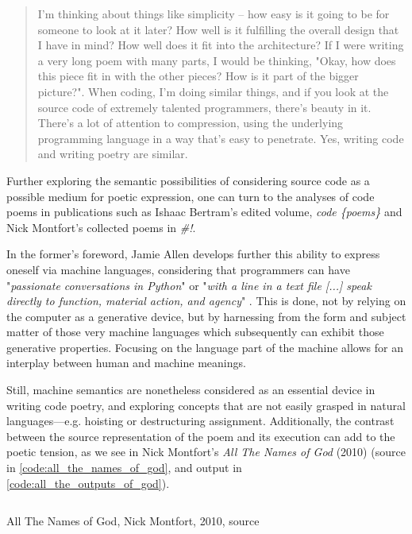 \begin{quote}
  I'm thinking about things like simplicity -- how easy is it going to be for someone to look at it later? How well is it fulfilling the overall design that I have in mind? How well does it fit into the architecture? If I were writing a very long poem with many parts, I would be thinking, "Okay, how does this piece fit in with the other pieces? How is it part of the bigger picture?". When coding, I'm doing similar things, and if you look at the source code of extremely talented programmers, there's beauty in it. There's a lot of attention to compression, using the underlying programming language in a way that's easy to penetrate. Yes, writing code and writing poetry are similar.  \citep{jeiss_poetry_2002}
\end{quote}

Further exploring the semantic possibilities of considering source code as a possible medium for poetic expression, one can turn to the analyses of code poems in publications such as Ishaac Bertram's edited volume, \emph{code \{poems\}} and Nick Montfort's collected poems in \emph{\#!}.

In the former's foreword, Jamie Allen develops further this ability to express oneself via machine languages, considering that programmers can have "\emph{passionate conversations in Python}" or "\emph{with a line in a text file [...] speak directly to function, material action, and agency}" \citep{bertram_code_2012}. This is done, not by relying on the computer as a generative device, but by harnessing from the form and subject matter of those very machine languages which subsequently can exhibit those generative properties. Focusing on the language part of the machine allows for an interplay between human and machine meanings.

Still, machine semantics are nonetheless considered as an essential device in writing code poetry, and exploring concepts that are not easily grasped in natural languages—e.g. hoisting or destructuring assignment. Additionally, the contrast between the source representation of the poem and its execution can add to the poetic tension, as we see in Nick Montfort's \emph{All The Names of God} (2010) (source in \ref{code:all_the_names_of_god}, and output in \ref{code:all_the_outputs_of_god}).

\begin{listing}
  \inputminted{perl}{./corpus/all_the_names_of_god.pl}
  \caption{All The Names of God, Nick Montfort, 2010, source}
  \label{code:all_the_names_of_god}
\end{listing}

